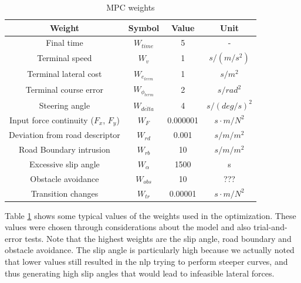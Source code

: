\documentclass[a4paper, onecolumn, 12pt]{article}
\begin{document}
\begin{table}[H] 
    \centering
    \caption{MPC weights} \label{weights}
    \begin{tabular}{ |c|c|c|c| }
        \hline
        \textbf{Weight} & \textbf{Symbol} & \textbf{Value} & \textbf{Unit} \\ [0.5ex] 
        \hline
        \hline
        Final time & $W_{time}$ & 5 & -\\ 
        \hline
        Terminal speed & $W_{v}$ & 1 & $s/(m/s^2)$\\
        \hline
        Terminal lateral cost & $W_{e_{term}}$ & 1 & $s/m^2$ \\
        \hline
        Terminal course error & $W_{\phi_{term}}$ & 2 & $s/rad^2$ \\
        \hline
        Steering angle & $W_{\dot{delta}}$ & 4 & $s/(deg/s)^2$ \\
        \hline 
        Input force continuity ($F_x$, $F_y$) & $W_{F}$ & 0.000001 & $s \cdot m / N^2$ \\
        \hline
        Deviation from road descriptor & $W_{rd}$ & 0.001 & $s/m/m^2$ \\
        \hline
        Road Boundary intrusion & $W_{rb}$ & 10 & $s/m/m^2$ \\
        \hline
        Excessive slip angle & $W_\alpha$ & 1500 & s \\
        \hline
        Obstacle avoidance & $W_{obs}$ & 10 & ??? \\
        \hline
        Transition changes & $W_{tr}$ & 0.00001 & $s \cdot m / N^2$ \\
        \hline
    \end{tabular}
\end{table}
Table \ref{weights} shows some typical values of the weights used in the
optimization. These values were chosen through considerations about the model
and also trial-and-error tests. Note that the highest weights are the slip
angle, road boundary and obstacle avoidance. The slip angle is particularly high
because we actually noted that lower values still resulted in the nlp trying to
perform steeper curves, and thus generating high slip angles that would lead to
infeasible lateral forces. 
\end{document}
